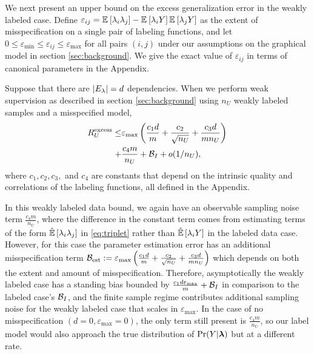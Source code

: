 We next present an upper bound on the excess generalization error in the weakly labeled case. Define $\varepsilon_{ij} = \mathbb{E}_{}\left[\lambda_i \lambda_j\right] - \mathbb{E}_{}\left[\lambda_i Y\right] \mathbb{E}_{}\left[\lambda_j Y\right]$ as the extent of misspecification on a single pair of labeling functions, and let $0 \le \varepsilon_{\min} \le \varepsilon_{ij} \le \varepsilon_{\max}$ for all pairs $(i, j)$ under our assumptions on the graphical model in section \ref{sec:background}. We give the exact value of $\varepsilon_{ij}$ in terms of canonical parameters 
in the Appendix. 
\begin{theorem}
Suppose that there are $|E_{\lambda}| = d$ dependencies. When we perform weak supervision as described in section \ref{sec:background} using $n_U$ weakly labeled samples and a misspecified model, 
\begin{align}
    R_U^{\mathrm{excess}} \le  & \varepsilon_{\max} \left(\frac{c_1 d}{m} + \frac{c_2}{\sqrt{n_U}} + \frac{c_3d }{m n_U}\right) \\
    + &\frac{c_4 m}{n_U} + \mathcal{B}_I + o(1/n_U), \nonumber
\end{align}
where $c_1, c_2, c_3,$ and $c_4$ are constants that depend on the intrinsic quality and correlations of the labeling functions, all defined in the Appendix. 
\label{thm:unlabeled}
\end{theorem}

In this weakly labeled data bound, we again have an observable sampling noise term $\frac{c_4 m}{n_U}$, where the difference in the constant term comes from estimating terms of the form $\hat{\mathbb{E}}\left[\lambda_i \lambda_j\right]$ in \eqref{eq:triplet} rather than $\hat{\mathbb{E}}\left[\lambda_i Y\right]$ in the labeled data case. However, for this case the parameter estimation error has an additional misspecification term $\mathcal{B}_{\mathrm{est}} :=\varepsilon_{\max} \left(\frac{c_1 d}{m} + \frac{c_2 }{\sqrt{n_U}} + \frac{c_3 d}{m n_U}\right)$ which depends on both the extent and amount of misspecification. Therefore, asymptotically the weakly labeled case has a standing bias bounded by $\frac{c_1 d \varepsilon_{\max}}{m} +\mathcal{B}_I$ in comparison to the labeled case's $\mathcal{B}_I$, and the finite sample regime contributes additional sampling noise for the weakly labeled case that scales in $\varepsilon_{\max}$. In the case of no misspecification $(d = 0, \varepsilon_{\max} = 0)$, the only term still present is $\frac{c_4 m}{n_U}$, so our label model would also approach the true distribution of $\Pr(Y | \bm{\lambda})$ but at a different rate. 

